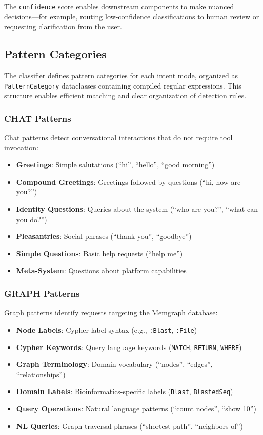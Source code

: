 The \texttt{confidence} score enables downstream components to make nuanced decisions---for example, routing low-confidence classifications to human review or requesting clarification from the user.

\subsection{Pattern Categories}

The classifier defines pattern categories for each intent mode, organized as \texttt{PatternCategory} dataclasses containing compiled regular expressions. This structure enables efficient matching and clear organization of detection rules.

\subsubsection{CHAT Patterns}

Chat patterns detect conversational interactions that do not require tool invocation:

\begin{itemize}
    \item \textbf{Greetings}: Simple salutations (``hi'', ``hello'', ``good morning'')
    \item \textbf{Compound Greetings}: Greetings followed by questions (``hi, how are you?'')
    \item \textbf{Identity Questions}: Queries about the system (``who are you?'', ``what can you do?'')
    \item \textbf{Pleasantries}: Social phrases (``thank you'', ``goodbye'')
    \item \textbf{Simple Questions}: Basic help requests (``help me'')
    \item \textbf{Meta-System}: Questions about platform capabilities
\end{itemize}

\subsubsection{GRAPH Patterns}

Graph patterns identify requests targeting the Memgraph database:

\begin{itemize}
    \item \textbf{Node Labels}: Cypher label syntax (e.g., \texttt{:Blast}, \texttt{:File})
    \item \textbf{Cypher Keywords}: Query language keywords (\texttt{MATCH}, \texttt{RETURN}, \texttt{WHERE})
    \item \textbf{Graph Terminology}: Domain vocabulary (``nodes'', ``edges'', ``relationships'')
    \item \textbf{Domain Labels}: Bioinformatics-specific labels (\texttt{Blast}, \texttt{BlastedSeq})
    \item \textbf{Query Operations}: Natural language patterns (``count nodes'', ``show 10'')
    \item \textbf{NL Queries}: Graph traversal phrases (``shortest path'', ``neighbors of'')
\end{itemize}


